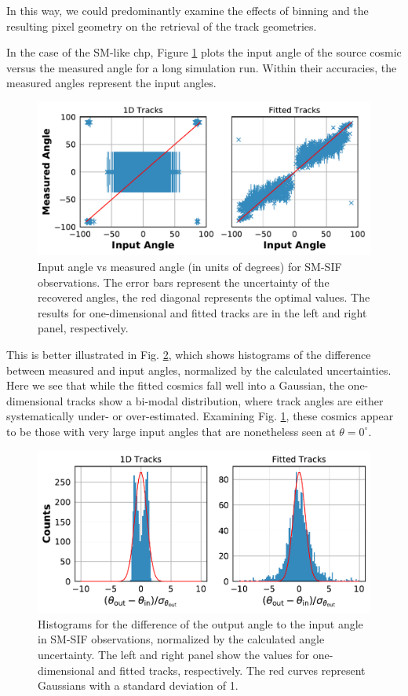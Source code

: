 \documentclass[a4paper, 11pt]{article}
\begin{document}
In this way, we could predominantly examine the effects of binning and the resulting pixel geometry on the retrieval of the track geometries.

In the case of the SM-like chp, Figure \ref{fig:AngleDist_SM} plots the input angle of the source cosmic versus the measured angle for a long simulation run. Within their accuracies, the measured angles represent the input angles.

\begin{figure}[h]
  \centering
  \includegraphics[width=\textwidth]{images/postprocessing/AngleDist_SM}
  \caption{Input angle vs measured angle (in units of degrees) for SM-SIF observations. The error bars represent the uncertainty of the recovered angles, the red diagonal represents the optimal values. The results for one-dimensional and fitted tracks are in the left and right panel, respectively.}
  \label{fig:AngleDist_SM}
\end{figure}

This is better illustrated in Fig. \ref{fig:AngleErr_SM}, which shows histograms of the difference between measured and input angles, normalized by the calculated uncertainties. Here we see that while the fitted cosmics fall well into a Gaussian, the one-dimensional tracks show a bi-modal distribution, where track angles are either systematically under- or over-estimated. Examining Fig. \ref{fig:AngleDist_SM}, these cosmics appear to be those with very large input angles that are nonetheless seen at $\theta = 0^\circ$.

\begin{figure}[h]
  \centering
  \includegraphics[width=\textwidth]{images/postprocessing/AngleErr_SM}
  \caption{Histograms for the difference of the output angle to the input angle in SM-SIF observations, normalized by the calculated angle uncertainty. The left and right panel show the values for one-dimensional and fitted tracks, respectively. The red curves represent Gaussians with a standard deviation of 1.}
  \label{fig:AngleErr_SM}
\end{figure}
\end{document}
